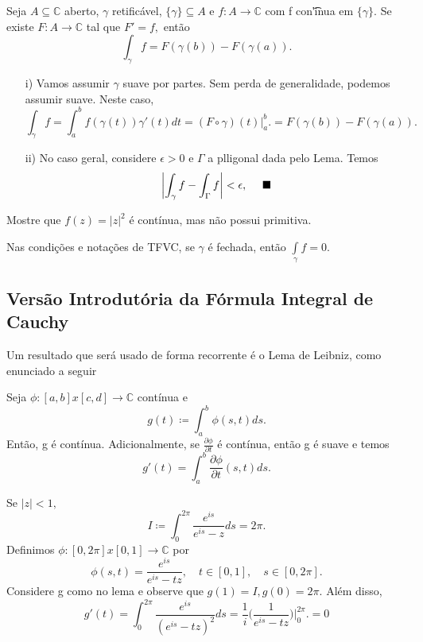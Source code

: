 \documentclass[complex.tex]{subfiles}
\begin{document}
\begin{theorem*}
	Seja $A\subseteq{\mathbb{C}}$ aberto, $\gamma$ retificável, $\{\gamma\}\subseteq{A}\text{ e }f:A\rightarrow \mathbb{C} $ com f
	con\t'inua em $\{\gamma\} $. Se existe $F:A\rightarrow \mathbb{C}$ tal que $F' = f,$ então
	$$
		\int_{\gamma}^{}f = F(\gamma(b)) - F(\gamma(a)).
	$$
\end{theorem*}
\begin{proof*}
	\begin{itemize}
		\item[i)] Vamos assumir $\gamma$ suave por partes. Sem perda de generalidade, podemos assumir suave. Neste caso,
		      $$
			      \int_{\gamma}^{}f = \int_{a}^{b} f(\gamma(t))\gamma'(t)dt = (F\circ{\gamma})(t)\biggl|_a^b\biggr. = F(\gamma(b)) - F(\gamma(a)).
		      $$
		\item[ii)] No caso geral, considere $\epsilon > 0$ e $\Gamma$ a plligonal dada pelo Lema. Temos
		      $$
			      \biggl|\int_{\gamma}^{}f - \int_{\Gamma}^{}f\biggr| < \epsilon, \quad\text{ $\blacksquare$}
		      $$
	\end{itemize}
\end{proof*}
\begin{exer*}
	Mostre que $f(z) = |z|^2$ é contínua, mas não possui primitiva.
\end{exer*}
\begin{crl*}
	Nas condições e notações de TFVC, se $\gamma$ é fechada, então $\int\limits_{\gamma}f = 0.$
\end{crl*}

\subsection{Versão Introdutória da Fórmula Integral de Cauchy}
Um resultado que será usado de forma recorrente é o Lema de Leibniz, como enunciado a seguir
\begin{lmm*}
	Seja $\phi:[a, b]x[c, d]\rightarrow \mathbb{C}$ contínua e
	$$
		g(t)\coloneqq  \int_{a}^{b}\phi(s, t)ds.
	$$
	Então, g é contínua. Adicionalmente, se $\frac{\partial{\phi}}{\partial{t}}$ é contínua, então g é suave e temos
	$$
		g'(t) = \int_{a}^{b}\frac{\partial{\phi}}{\partial{t}}(s, t)ds.
	$$
\end{lmm*}
\begin{example}
	Se $|z| < 1,$
	$$
		I\coloneqq  \int_{0}^{2\pi}\frac{e^{is}}{e^{is}-z}ds = 2\pi.
	$$
	Definimos $\phi:[0, 2\pi]x[0, 1]\rightarrow \mathbb{C}$ por
	$$
		\phi(s, t) = \frac{e^{is}}{e^{is} - tz}, \quad t\in[0, 1], \quad s\in[0, 2\pi].
	$$
	Considere g como no lema e observe que $g(1) = I, g(0) = 2\pi.$ Além disso,
	$$
		g'(t) = \int_{0}^{2\pi}\frac{e^{is}}{(e^{is} - tz)^{2}}ds = \frac{1}{i}\biggl(\frac{1}{e^{is}-tz}\biggr)\biggl|_0^{2\pi}\biggr. = 0
	$$
\end{example}
\end{document}
